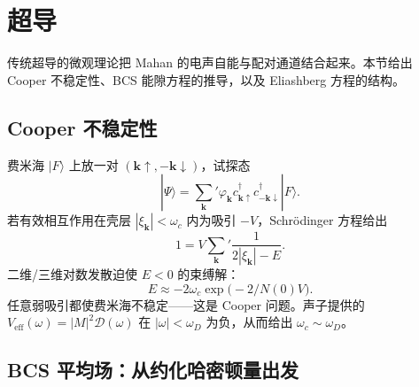 \section{超导}

传统超导的微观理论把 Mahan 的电声自能与配对通道结合起来。本节给出 Cooper 不稳定性、BCS 能隙方程的推导，以及 Eliashberg 方程的结构。

\subsection{Cooper 不稳定性}

费米海 $|F\rangle$ 上放一对 $(\mathbf{k}\uparrow,-\mathbf{k}\downarrow)$，试探态
\begin{equation}
  |\Psi\rangle
  =\sum_{\mathbf{k}}'
  \varphi_{\mathbf{k}}
  c_{\mathbf{k}\uparrow}^\dagger c_{-\mathbf{k}\downarrow}^\dagger
  |F\rangle.
\end{equation}
若有效相互作用在壳层 $|\xi_{\mathbf{k}}|<\omega_c$ 内为吸引 $-V$，Schrödinger 方程给出
\begin{equation}
  1
  =V\sum_{\mathbf{k}}'
  \frac{1}{2|\xi_{\mathbf{k}}|-E}.
\end{equation}
二维/三维对数发散迫使 $E<0$ 的束缚解：
\begin{equation}
  E
  \approx
  -2\omega_c\exp\bigl(-2/N(0)V\bigr).
\end{equation}
任意弱吸引都使费米海不稳定——这是 Cooper 问题。声子提供的 $V_{\mathrm{eff}}(\omega)=|M|^2\mathcal{D}(\omega)$ 在 $|\omega|<\omega_D$ 为负，从而给出 $\omega_c\sim\omega_D$。

\subsection{BCS 平均场：从约化哈密顿量出发}

